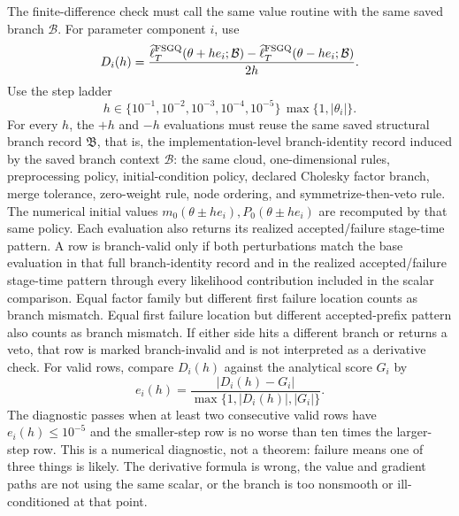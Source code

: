 \documentclass[11pt]{article}
\numberwithin{equation}{section}
\newcommand{\ellhat}{\widehat\ell}
\begin{document}
The finite-difference check must call the same value routine with the same
saved branch \(\mathcal B\).  For parameter component \(i\), use
\begin{equation}
  D_i(h)
  =
  \frac{
  \ellhat_T^{\rm FSGQ}(\theta+he_i;\mathcal B)
  -
  \ellhat_T^{\rm FSGQ}(\theta-he_i;\mathcal B)}
  {2h}.
  \label{eq:p31-central-diff}
\end{equation}
Use the step ladder
\begin{equation}
  h\in\{10^{-1},10^{-2},10^{-3},10^{-4},10^{-5}\}\,
  \max\{1,|\theta_i|\}.
  \label{eq:p31-fd-ladder}
\end{equation}
For every \(h\), the \(+\!h\) and \(-\!h\) evaluations must reuse the same
saved structural branch record \(\mathfrak B\), that is, the implementation-level
branch-identity record induced by the saved branch context \(\mathcal B\): the
same cloud,
one-dimensional rules, preprocessing policy, initial-condition policy,
declared Cholesky factor branch, merge tolerance, zero-weight rule, node
ordering, and symmetrize-then-veto rule.  The numerical initial values
\(m_0(\theta\pm he_i),P_0(\theta\pm he_i)\) are recomputed by that same policy.
Each evaluation also returns its realized accepted/failure stage-time pattern.
A row is branch-valid only if both perturbations match the base evaluation in
that full branch-identity record and in the realized accepted/failure
stage-time pattern through every likelihood contribution included in the scalar
comparison.  Equal factor family but different first failure location counts as
branch mismatch.  Equal first failure location but different accepted-prefix
pattern also counts as branch mismatch.  If either side hits a different branch
or returns a veto, that row is marked branch-invalid and is not interpreted as a
derivative check.  For valid rows, compare \(D_i(h)\) against the analytical
score \(G_i\) by
\begin{equation}
  e_i(h)=
  \frac{|D_i(h)-G_i|}
  {\max\{1,|D_i(h)|,|G_i|\}}.
  \label{eq:p31-fd-relative-error}
\end{equation}
The diagnostic passes when at least two consecutive valid rows have
\(e_i(h)\le 10^{-5}\) and the smaller-step row is no worse than ten times the
larger-step row.  This is a numerical diagnostic, not a theorem: failure means
one of three things is likely.  The derivative formula is wrong, the value and
gradient paths are not using the same scalar, or the branch is too nonsmooth or
ill-conditioned at that point.
\end{document}
